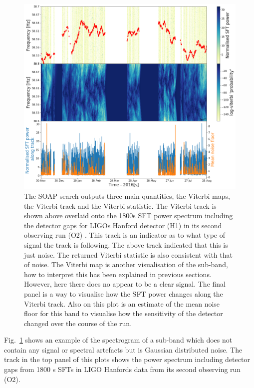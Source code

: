 \begin{figure}
	\centering
	\includegraphics[width=\textwidth]{C5_detchar/track_F58_5_58_7_noise.png}
	\caption[Example SOAP output for Gaussian like noise.]{The SOAP search outputs three main quantities, the Viterbi maps, the Viterbi track and the Viterbi statistic. The Viterbi track is shown above overlaid onto the 1800s \gls{SFT} power spectrum including the detector gaps for \glspl{LIGO} Hanford detector (H1) in its second observing run (O2) \citep{}. This track is an indicator as to what type of signal the track is following. The above track indicated that this is just noise. The returned Viterbi statistic is also consistent with that of noise. The Viterbi map is another visualisation of the sub-band, how to interpret this has been explained in previous sections. However, here there does no appear to be a clear signal. The final panel is a way to visualise how the \gls{SFT} power changes along the Viterbi track. Also on this plot is an estimate of the mean noise floor for this band to visualise how the sensitivity of the detector changed over the course of the run. }
	\label{detchar:soap:noiseplot}
\end{figure}
%
Fig.~\ref{detchar:soap:noiseplot} shows an example of the spectrogram of a sub-band which does not contain any signal or spectral artefacts but is Gaussian distributed noise. 
The track in the top panel of this plots shows the power spectrum including detector gaps from 1800 s \glspl{SFT} in \gls{LIGO} Hanfords data from its second observing run (O2). 
